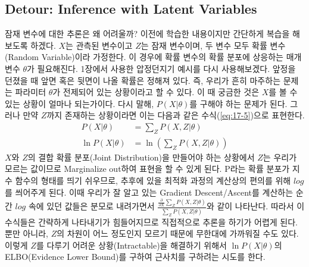 \documentclass[draft=false]{oblivoir}
\begin{document}
\subsection{Detour: Inference with Latent Variables}
잠재 변수에 대한 추론은 왜 어려울까? 이전에 학습한 내용이지만 간단하게 복습을 해보도록 하겠다. $X$는 관측된 변수이고 $Z$는 잠재 변수이며, 두 변수 모두 확률 변수(Random Variable)이라 가정한다. 이 경우에 확률 변수의 확률 분포에 상응하는 매개 변수 $\theta$가 필요해진다. 1장에서 사용한 압정던지기 예시를 다시 사용해보겠다. 앞정을 던졌을 때 앞면 혹은 뒷면이 나올 확률은 정해져 있다. 즉, 우리가 흔히 마주하는 문제는 파라미터 $\theta$가 전제되어 있는 상황이라고 할 수 있다. 이 때 궁금한 것은 $X$를 볼 수 있는 상황이 얼마나 되는가이다. 다시 말해, $P(X|\theta)$를 구해야 하는 문제가 된다. 그러나 만약 $Z$까지 존재하는 상황이라면 이는 다음과 같은 수식(\ref{eq:17-5})으로 표현한다.
\begin{equation}
	\begin{split}
	P(X|\theta) & = \sum_{Z} P(X,Z|\theta) \\
    \ln{P(X|\theta)} & = \ln{(\sum_{Z} P(X,Z|\theta))}
	\end{split}
	\label{eq:17-5}
\end{equation}
$X$와 $Z$의 결합 확률 분포(Joint Distribution)을 만들어야 하는 상황에서 $Z$는 우리가 모르는 값이므로 Marginalize out하여 표현을 할 수 있게 된다. P라는 확률 분포가 지수 함수의 형태를 띄기 쉬우므로, 추후에 있을 최적화 과정의 계산상의 편의를 위해 $log$를 씌어주게 된다. 이때 우리가 잘 알고 있는 Gradient Descent/Ascent를 계산하는 순간 $log$ 속에 있던 값들은 분모로 내려가면서 $\frac{\frac{\partial}{\partial X} \sum_{Z}P(X,Z|\theta)}{\sum_{Z}P(X,Z|\theta)}$와 같이 나타난다. 따라서 이 수식들은 간략하게 나타내기가 힘들어지므로 직접적으로 추론을 하기가 어렵게 된다. 뿐만 아니라, $Z$의 차원이 어느 정도인지 모르기 때문에 무한대에 가까워질 수도 있다. 이렇게 $Z$를 다루기 어려운 상황(Intractable)을 해결하기 위해서 $\ln{P(X|\theta)}$의 ELBO(Evidence Lower Bound)를 구하여 근사치를 구하려는 시도를 한다.

\end{document}
